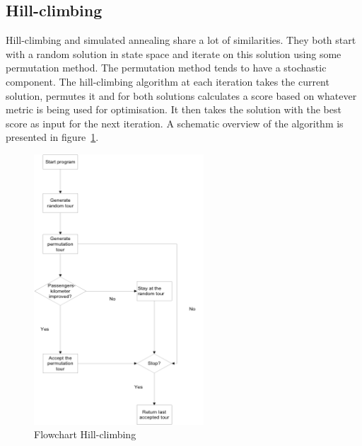 \documentclass[journal]{IEEEtran}
\begin{document}
\subsection{Hill-climbing}
Hill-climbing and simulated annealing share a lot of similarities. They both start with a random solution in state space and iterate on this solution using some permutation method. The permutation method tends to have a stochastic component. The hill-climbing algorithm at each iteration takes the current solution, permutes it and for both solutions calculates a score based on whatever metric is being used for optimisation. It then takes the solution with the best score as input for the next iteration. A schematic overview of the algorithm is presented in figure~\ref{fig:flowchart_hc}.
\\
\begin{figure}[!h]
\centering
\includegraphics[width=2.5in]{flowchart_hc}
\caption{Flowchart Hill-climbing}
\label{fig:flowchart_hc}
\end{figure}
\\
\end{document}
